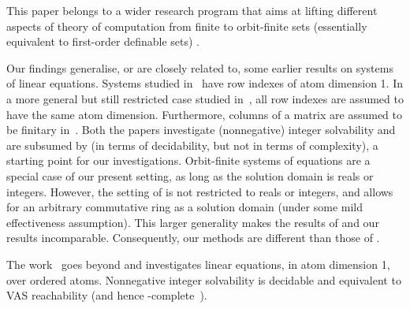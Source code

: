 This paper belongs to a wider research program that aims at lifting different aspects of 
theory of computation from finite to orbit-finite sets (essentially equivalent to first-order definable sets)
\cite{lics11,datamonoids,program-atoms,BKLT13,lmcs14,KLOT14,CL15,KKOT15,KLOT16,BT18,KKLO19}.

Our findings generalise, or are closely related to, some earlier %
results %
on systems of linear equations.
%
Systems studied in~\cite{HLT17} have row indexes of atom dimension 1.
In a more general but still restricted case studied in~\cite{HR21},
all row indexes are assumed to have the same atom dimension. 
%
%
Furthermore, columns of a matrix are assumed to be finitary in~\cite{HLT17,HR21}.
Both the papers investigate (nonnegative) integer solvability and are subsumed by
\cite{GHL22} (in terms of decidability, but not in terms of complexity), 
a starting point for our investigations.
%
Orbit-finite systems of equations are a special case of our present setting, as long as
   the solution domain is reals or integers. However, the setting of \cite{GHL22} is not 
   restricted to reals or integers, and allows for an arbitrary commutative ring as a solution domain
   (under some mild effectiveness assumption). This larger generality makes the results of 
   \cite{GHL22} and our results incomparable. Consequently, our methods are different than those
   of \cite{GHL22}.
   
The work~\cite{HL18} goes beyond \cite{HLT17} and investigates linear equations, in atom dimension 1,
over ordered atoms. 
Nonnegative integer solvability is decidable and equivalent to VAS reachability  
(and hence \ackermann-complete~\cite{CO,L,Lasota22}).

